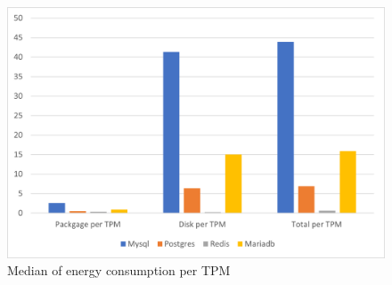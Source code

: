 \begin{figure}[h]
\centering
    \includegraphics[width=0.8\columnwidth]{results/median/10m/energy-tpm.png}
\caption{Median of energy consumption per TPM}
\label{fig:mediantpmenergy10m}
\end{figure}


